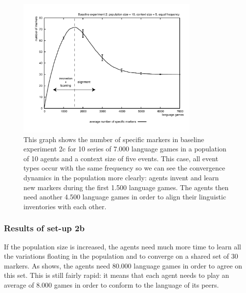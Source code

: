 \begin{figure}[ht]
\centerline{\includegraphics[width=0.8\textwidth]{Chapter3/figs/graph-base2-size2}}
  \caption[Baseline experiment 2c: number of markers (equal frequency)]{This graph shows the number of specific markers in baseline experiment 2c for 10 series of 7.000 language games in a population of 10 agents and a context size of five events. This case, all event types occur with the same frequency so we can see the convergence dynamics in the population more clearly: agents invent and learn new markers during the first 1.500 language games. The agents then need another 4.500 language games in order to align their linguistic inventories with each other.}
   \label{f:base2-size2}
\end{figure}
\subsubsection{Results of set-up 2b}
 If the population size is increased, the agents need much more time to learn all the variations floating in the population and to converge on a shared set of 30 markers. As  shows, the agents need 80.000 language games in order to agree on this set. This is still fairly rapid: it means that each agent needs to play an average of 8.000 games in order to conform to the language of its peers.


